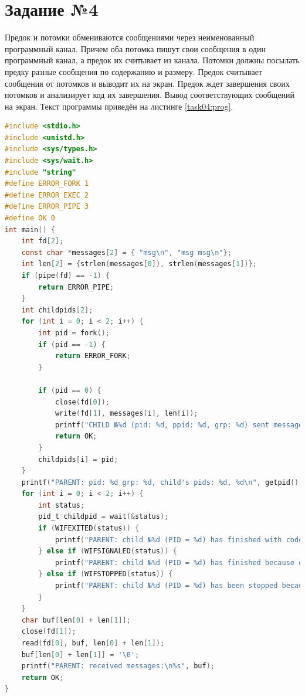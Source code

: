 \documentclass[12pt]{report}
\begin{document}
\section*{Задание №4}

Предок и потомки обмениваются сообщениями через неименованный программный канал. Причем оба потомка пишут свои сообщения в один программный канал, а предок их считывает из канала. Потомки должны посылать предку разные сообщения по содержанию и размеру. Предок считывает сообщения от потомков и выводит их на экран. Предок ждет завершения своих потомков и анализирует код их завершения. Вывод соответствующих сообщений на экран. Текст программы приведён на листинге \ref{task04:prog}.

\begin{lstlisting}[label=task04:prog,caption=Программные каналы,language=C]
#include <stdio.h>
#include <unistd.h>
#include <sys/types.h>
#include <sys/wait.h>
#include "string"
#define ERROR_FORK 1
#define ERROR_EXEC 2
#define ERROR_PIPE 3
#define OK 0
int main() {
    int fd[2];
    const char *messages[2] = { "msg\n", "msg msg\n"};
    int len[2] = {strlen(messages[0]), strlen(messages[1])};
    if (pipe(fd) == -1) {
        return ERROR_PIPE;
    }
    int childpids[2];
    for (int i = 0; i < 2; i++) {
        int pid = fork();
        if (pid == -1) {
            return ERROR_FORK;
        }

        if (pid == 0) {
            close(fd[0]);
            write(fd[1], messages[i], len[i]);
            printf("CHILD №%d (pid: %d, ppid: %d, grp: %d) sent message to parent\n", i + 1, getpid(), getppid(), getpgrp());
            return OK;
        }
        childpids[i] = pid;
    }
    printf("PARENT: pid: %d grp: %d, child's pids: %d, %d\n", getpid(), getpgrp(), childpids[0], childpids[1]);
    for (int i = 0; i < 2; i++) {
        int status;
        pid_t childpid = wait(&status);
        if (WIFEXITED(status)) {
            printf("PARENT: child №%d (PID = %d) has finished with code: %d\n", i + 1, childpid, WEXITSTATUS(status));
        } else if (WIFSIGNALED(status)) {
            printf("PARENT: child №%d (PID = %d) has finished because of signal: %d\n", i + 1, childpid, WTERMSIG(status));
        } else if (WIFSTOPPED(status)) {
            printf("PARENT: child №%d (PID = %d) has been stopped because of signal: %d\n", i + 1, childpid, WSTOPSIG(status));
        }
    }
    char buf[len[0] + len[1]];
    close(fd[1]);
    read(fd[0], buf, len[0] + len[1]);
    buf[len[0] + len[1]] = '\0';
    printf("PARENT: received messages:\n%s", buf);
    return OK;
}
\end{lstlisting}
\end{document}
